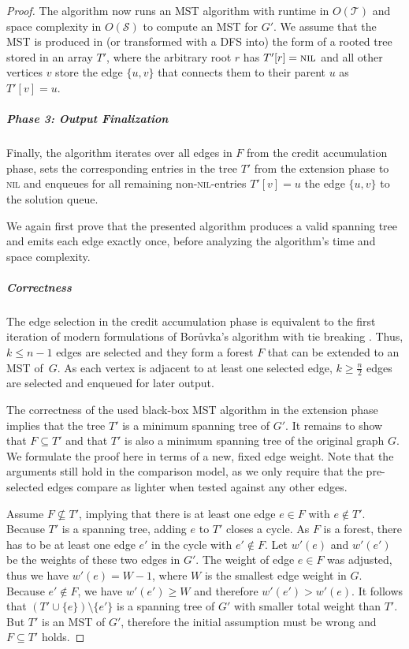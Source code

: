 \documentclass[a4paper, USenglish, cleveref, autoref, thm-restate]{lipics-v2021}
\newcommand{\totaltime}{\mathcal{T}}
\newcommand{\totalspace}{\mathcal{S}}
\begin{document}
\begin{proof}
	The algorithm now runs an MST algorithm with runtime in $O(\totaltime)$ and space complexity in $O(\totalspace)$ to compute an MST for $G'$.
	We assume that the MST is produced in (or transformed with a DFS into) the form of a rooted tree stored in an array $T'$, where the arbitrary root $r$ has $T'[r] = \textsc{nil}$ and all other vertices $v$ store the edge $\{u,v\}$ that connects them to their parent $u$ as $T'[v] = u$.
	
	\subparagraph*{Phase 3: Output Finalization}
	Finally, the algorithm iterates over all edges in $F$ from the credit accumulation phase, sets the corresponding entries in the tree $T'$ from the extension phase to \textsc{nil} and enqueues for all remaining non-\textsc{nil}-entries $T'[v] = u$ the edge $\{u,v\}$ to the solution queue.
	
	\medskip
	
	We again first prove that the presented algorithm produces a valid spanning tree and emits each edge exactly once, before analyzing the algorithm's time and space complexity.
	
	\subparagraph*{Correctness}
	
	The edge selection in the credit accumulation phase is equivalent to the first iteration of modern formulations of Borůvka's algorithm with tie breaking \cite{boruvkaJistemProblemuMinimalnim1926,ericksonAlgorithms2019}.
	Thus, $k \leq n-1$ edges are selected and they form a forest $F$ that can be extended to an MST of~$G$.
	As each vertex is adjacent to at least one selected edge, $k \geq \frac{n}{2}$ edges are selected and enqueued for later output.
	
	The correctness of the used black-box MST algorithm in the extension phase implies that the tree $T'$ is a minimum spanning tree of $G'$.
	It remains to show that $F \subseteq T'$ and that $T'$ is also a minimum spanning tree of the original graph $G$.
	We formulate the proof here in terms of a new, fixed edge weight.
	Note that the arguments still hold in the comparison model, as we only require that the pre-selected edges compare as lighter when tested against any other edges.
	
	Assume $F \nsubseteq T'$, implying that there is at least one edge $e \in F$ with $e \notin T'$.
	Because $T'$ is a spanning tree, adding $e$ to $T'$ closes a cycle.
	As $F$ is a forest, there has to be at least one edge $e'$ in the cycle with $e' \notin F$.
	Let $w'(e)$ and $w'(e')$ be the weights of these two edges in $G'$.
	The weight of edge $e \in F$ was adjusted, thus we have $w'(e) = W - 1$, where $W$ is the smallest edge weight in $G$.
	Because $e' \notin F$, we have $w'(e') \geq W$ and therefore $w'(e') > w'(e)$.
	It follows that $(T' \cup \{e\}) \setminus \{e'\}$ is a spanning tree of $G'$ with smaller total weight than $T'$.
	But $T'$ is an MST of $G'$, therefore the initial assumption must be wrong and $F \subseteq T'$ holds.
	

\end{proof}
\end{document}
